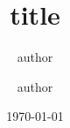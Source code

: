 \documentclass[pdf, unicode, 10pt, aspectratio=169]{beamer}
\title[title]{title}
\author[authors]{author\inst{1,2} \and author\inst{1}}
\institute{\inst{1} institute \and \inst{2} institute}
\date{\today}
\begin{document}
\customtitle
\end{document}
